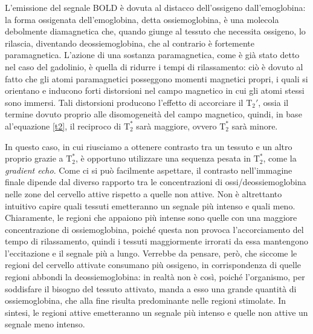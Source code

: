 \documentclass{report}
\renewcommand{\eqref}[1]{equazione \ref{#1}}
\numberwithin{equation}{section}
\numberwithin{figure}{section}
\begin{document}
\noindent L'emissione del segnale BOLD è dovuta al distacco dell'ossigeno dall'emoglobina: la forma ossigenata dell'emoglobina, detta ossiemoglobina, è una molecola debolmente diamagnetica che, quando giunge al tessuto che necessita ossigeno, lo rilascia, diventando deossiemoglobina, che al contrario è fortemente paramagnetica. L'azione di una sostanza paramagnetica, come è già stato detto nel caso del gadolinio, è quella di ridurre i tempi di rilassamento: ciò è dovuto al fatto che gli atomi paramagnetici posseggono momenti magnetici propri, i quali si orientano e inducono forti distorsioni nel campo magnetico in cui gli atomi stessi sono immersi. Tali distorsioni producono l'effetto di accorciare il $\mathrm{T}_2'$, ossia il termine dovuto proprio alle disomogeneità del campo magnetico, quindi, in base al'\eqref{t2}, il reciproco di $\mathrm{T}_2^*$ sarà maggiore, ovvero $\mathrm{T}_2^*$ sarà minore.

In questo caso, in cui riusciamo a ottenere contrasto tra un tessuto e un altro proprio grazie a $\mathrm{T}_2^*$, è opportuno utilizzare una sequenza pesata in $\mathrm{T}_2^*$, come la \textit{gradient echo}. Come ci si può facilmente aspettare, il contrasto nell'immagine finale dipende dal diverso rapporto tra le concentrazioni di ossi/deossiemoglobina nelle zone del cervello attive rispetto a quelle non attive. Non è altrettanto intuitivo capire quali tessuti emetteranno un segnale più intenso e quali meno. Chiaramente, le regioni che appaiono più intense sono quelle con una maggiore concentrazione di ossiemoglobina, poiché questa non provoca l'accorciamento del tempo di rilassamento, quindi i tessuti maggiormente irrorati da essa mantengono l'eccitazione e il segnale più a lungo. Verrebbe da pensare, però, che siccome le regioni del cervello attivate consumano più ossigeno, in corrispondenza di quelle regioni abbondi la deossiemoglobina: in realtà non è così, poiché l'organismo, per soddisfare il bisogno del tessuto attivato, manda a esso una grande quantità di ossiemoglobina, che alla fine risulta predominante nelle regioni stimolate. In sintesi, le regioni attive emetteranno un segnale più intenso e quelle non attive un segnale meno intenso.
\end{document}
